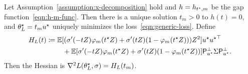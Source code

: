 \begin{lemma}
  \label{lemma:generic-solutions}
  Let Assumption~\ref{assumption:x-decomposition} hold and $h = h_{t^\star,m}$
  be the gap function~\eqref{eqn:h-m-func}. Then there is a unique solution
  $t_m > 0$ to $h(t) = 0$, and
  $\theta^\star_L = t_m u^\star$ uniquely minimizes
  the loss~\eqref{eqn:generic-loss}. Define
  \begin{equation}
    \begin{split}
      H_L(t) &
      \coloneqq \mathbb{E}[(\sigma'(-tZ) \varphi_m(t^\star Z) + \sigma'(tZ)
	(1 - \varphi_m(t^\star Z))) Z^2 ] u^\star {u^\star}^\top \\
      & \qquad
      ~ + \mathbb{E}[\sigma'(-tZ) \varphi_m(t^\star Z)
	+ \sigma'(tZ) (1 - \varphi_m(t^\star Z))]
      \mathsf{P}_{u^\star}^\perp \Sigma \mathsf{P}_{u^\star}^\perp.
    \end{split}
    \label{eqn:parameterized-hessian}
  \end{equation}
  Then the Hessian is $\nabla^2 L(\theta^\star_L, \sigma) = H_L(t_m)$.
\end{lemma}

